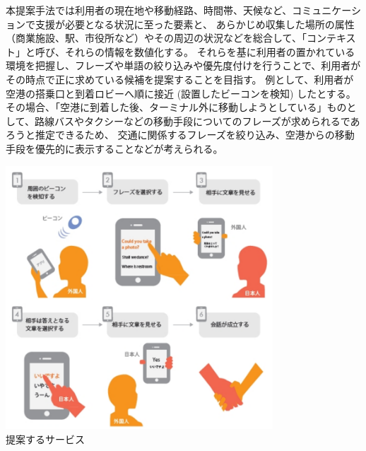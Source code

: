 \documentclass[11pt,papersize]{jsbook}
\begin{document}
本提案手法では利用者の現在地や移動経路、時間帯、天候など、コミュニケーションで支援が必要となる状況に至った要素と、
あらかじめ収集した場所の属性（商業施設、駅、市役所など）やその周辺の状況などを総合して、「コンテキスト」と呼び、それらの情報を数値化する。
それらを基に利用者の置かれている環境を把握し、フレーズや単語の絞り込みや優先度付けを行うことで、利用者がその時点で正に求めている候補を提案することを目指す。
例として、利用者が空港の搭乗口と到着ロビーへ順に接近 (設置したビーコンを検知) したとする。
その場合、「空港に到着した後、ターミナル外に移動しようとしている」ものとして、路線バスやタクシーなどの移動手段についてのフレーズが求められるであろうと推定できるため、
交通に関係するフレーズを絞り込み、空港からの移動手段を優先的に表示することなどが考えられる。
\begin{center}
\includegraphics[width=10cm]{abc.pdf}\\
提案するサービス
\end{center}
\end{document}
